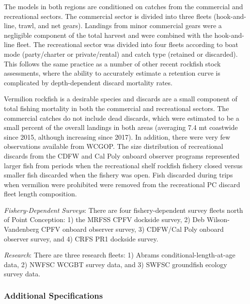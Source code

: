 \documentclass[
  english,
  a4paper,
]{article}
\begin{document}
The models in both regions are conditioned on catches from the commercial and recreational sectors. The commercial sector is divided into three fleets (hook-and-line, trawl, and net gears). Landings from minor commercial gears were a negligible component of the total harvest and were combined with the hook-and-line fleet. The recreational sector was divided into four fleets according to boat mode (party/charter or private/rental) and catch type (retained or discarded). This follows the same practice as a number of other recent rockfish stock assessments, where the ability to accurately estimate a retention curve is complicated by depth-dependent discard mortality rates.

Vermilion rockfish is a desirable species and discards are a small component of total fishing mortality in both the commercial and recreational sectors. The commercial catches do not include dead discards, which were estimated to be a small percent of the overall landings in both areas (averaging 7.4 mt coastwide since 2015, although increasing since 2017). In addition, there were very few observations available from WCGOP. The size distribution of recreational discards from the CDFW and Cal Poly onboard observer programs represented larger fish from periods when the recreational shelf rockfish fishery closed versus smaller fish discarded when the fishery was open. Fish discarded during trips when vermilion were prohibited were removed from the recreational PC discard fleet length composition.

\emph{Fishery-Dependent Surveys}: There are four fishery-dependent survey fleets north
of Point Conception:
1) the MRFSS CPFV dockside survey,
2) Deb Wilson-Vandenberg CPFV onboard observer survey,
3) CDFW/Cal Poly onboard observer survey, and
4) CRFS PR1 dockside survey.

\emph{Research}:
There are three research fleets:
1) Abrams conditional-length-at-age data,
2) NWFSC WCGBT survey data, and
3) SWFSC groundfish ecology survey data.

\hypertarget{additional-specifications}{%
\subsubsection{Additional Specifications}\label{additional-specifications}}
\end{document}
